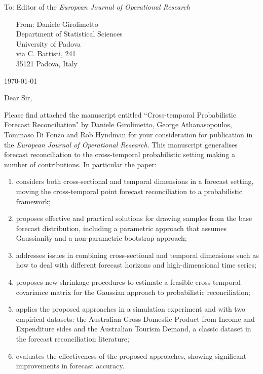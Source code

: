 \documentclass[11pt,a4paper]{letter}
\date{}
\begin{document}
 \begin{letter}{To: Editor of the \textit{European Journal of Operational Research}}
\begin{itemize}
	\item[From:] Daniele Girolimetto\\ 
	Department of Statistical Sciences\\
	University of Padova\\
	via C. Battisti, 241\\ 35121 Padova, Italy
\end{itemize}

 \opening{\today\ \\}
 \medskip
Dear Sir,

Please find attached the manuscript entitled ``Cross-temporal Probabilistic Forecast Reconciliation" by Daniele Girolimetto, George Athanasopoulos, Tommaso Di Fonzo and Rob Hyndman for your consideration for publication in the \textit{European Journal of Operational Research}. 
This manuscript generalises forecast reconciliation to the cross-temporal probabilistic setting making a number of contributions.
In particular the paper:
\begin{enumerate}
	\item considers both cross-sectional and temporal dimensions in a forecast setting, moving the cross-temporal point forecast reconciliation to a probabilistic framework;
	\item proposes effective and practical solutions for drawing samples from the base forecast distribution, including a parametric approach that assumes Gaussianity and a non-parametric bootstrap approach;
	\item addresses issues in combining cross-sectional and temporal dimensions such as how to deal with different forecast horizons and high-dimensional time series;
	\item proposes new shrinkage procedures to estimate a feasible cross-temporal covariance matrix for the Gaussian approach to probabilistic reconciliation;
	\item applies the proposed approaches in a simulation experiment and with two empirical datasets: the Australian Gross Domestic Product from Income and Expenditure sides and the Australian Tourism Demand, a classic dataset in the forecast reconciliation literature;
	\item evaluates the effectiveness of the proposed approaches, showing significant improvements in forecast accuracy.
\end{enumerate}


\end{letter}
\end{document}
